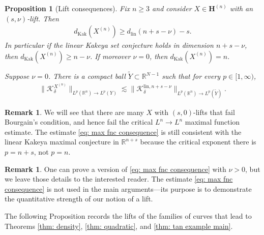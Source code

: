 \documentclass[reqno,11pt]{amsart}
\numberwithin{equation}{section}
\numberwithin{figure}{section}
\def\R{\mathbb{R}}
\renewcommand\geq{\geqslant}
\theoremstyle{plain}
\newtheorem{proposition}[thm]{Proposition}
\theoremstyle{definition}
\newtheorem{remark}[thm]{Remark}
\newcommand{\Kak}{\mathrm{Kak}}
\newcommand{\lin}{\mathrm{lin}}
\begin{document}
    \begin{proposition}[Lift consequences]\label{prop: lift consequences}
        Fix $n \geq 3$ and consider $X \in \mathbf H^{(n)}$ with an $(s,\nu)$-lift. Then 
        \begin{align}\label{eq: dimension consequence}
            d_{\Kak}(X^{(n)}) \geq d_{\lin}(n+s-\nu) - s.
        \end{align}
        In particular if the linear Kakeya set conjecture holds in dimension $n+s-\nu$, then $d_{\Kak}(X^{(n)}) \geq n-\nu$. If moreover $\nu = 0$, then $d_{\Kak}(X^{(n)}) = n$. 

        Suppose $\nu = 0$. There is a compact ball $\widetilde Y \subset \R^{N-1}$ such that for every $p \in [1,\infty)$,
        \begin{align}\label{eq: max fnc consequence}
            \|\mathcal K_{\delta}^{X^{(n)}}\|_{L^p(\R^n) \to L^p(Y)} \lesssim  \|\mathcal K_\delta^{\lin, n+s-\nu} \|_{L^p(\R^n) \to L^p(\widetilde Y)}.
        \end{align}
    \end{proposition} 

    \begin{remark}
        We will see that there are many $X$ with $(s,0)$-lifts that fail Bourgain's condition, and hence fail the critical $L^n \to L^n$ maximal function estimate. The estimate \eqref{eq: max fnc consequence} is still consistent with the linear Kakeya maximal conjecture in $\R^{n+s}$ because the critical exponent there is $p = n+s$, not $p = n$. 
    \end{remark}

    \begin{remark}
        One can prove a version of \eqref{eq: max fnc consequence} with $\nu > 0$, but we leave those details to the interested reader. The estimate \eqref{eq: max fnc consequence} is not used in the main arguments---its purpose is to demonstrate the quantitative strength of our notion of a lift. 
    \end{remark}


    The following Proposition records the lifts of the families of curves that lead to Theorems \ref{thm: density}, \ref{thm: quadratic}, and \ref{thm: tan example main}.
    
\end{document}
